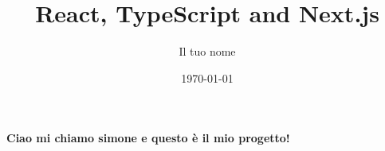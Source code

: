 \documentclass{article}
\title{React, TypeScript and Next.js}
\author{Il tuo nome}
\date{\today}
\begin{document}
\maketitle
\paragraph{Ciao mi chiamo simone e questo è il mio progetto!}
\end{document}
